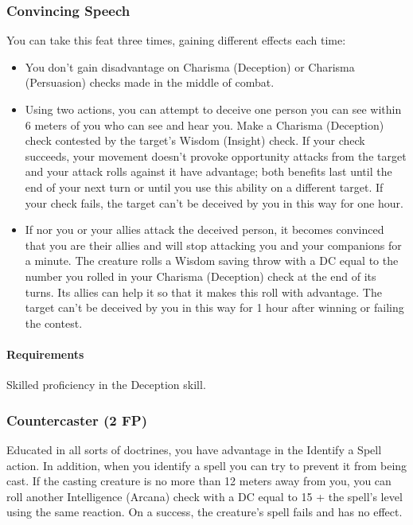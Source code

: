 \subsubsection{Convincing Speech} \label{feat::convincingspeech}
    You can take this feat three times, gaining different effects each time:
    \begin{itemize}
        \item You don't gain disadvantage on Charisma (Deception) or Charisma (Persuasion) checks made in the middle of combat.
        \item Using two actions, you can attempt to deceive one person you can see within 6 meters of you who can see and hear you.
        Make a Charisma (Deception) check contested by the target's Wisdom (Insight) check.
        If your check succeeds, your movement doesn't provoke opportunity attacks from the target and your attack rolls against it have advantage; both benefits last until the end of your next turn or until you use this ability on a different target.
        If your check fails, the target can't be deceived by you in this way for one hour.
        \item If nor you or your allies attack the deceived person, it becomes convinced that you are their allies and will stop attacking you and your companions for a minute.
        The creature rolls a Wisdom saving throw with a DC equal to the number you rolled in your Charisma (Deception) check at the end of its turns.
        Its allies can help it so that it makes this roll with advantage.
        The target can't be deceived by you in this way for 1 hour after winning or failing the contest.
    \end{itemize}
    \paragraph{Requirements} Skilled proficiency in the Deception skill.
\subsubsection{Countercaster (2 FP)} \label{feat::countercaster}
    Educated in all sorts of doctrines, you have advantage in the Identify a Spell action.
    In addition, when you identify a spell you can try to prevent it from being cast.
    If the casting creature is no more than 12 meters away from you, you can roll another Intelligence (Arcana) check with a DC equal to 15 + the spell's level using the same reaction.
    On a success, the creature's spell fails and has no effect.
